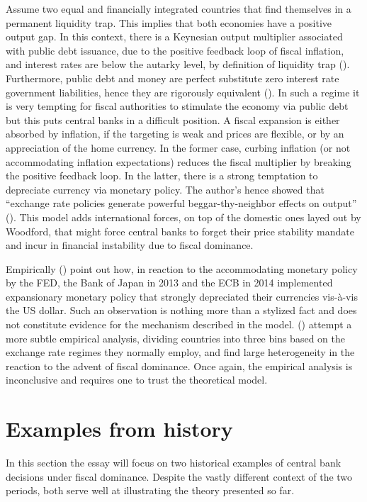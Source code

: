 \documentclass[american]{scrartcl}
\newcommand{\citein}[1]{\citeauthor{#1} (\citeyear{#1})}
\begin{document}
Assume two equal and financially integrated countries that find themselves in a permanent liquidity trap. This implies that both economies have a positive output gap. In this context, there is a Keynesian output multiplier associated with public debt issuance, due to the positive feedback loop of fiscal inflation, and interest rates are below the autarky level, by definition of liquidity trap (\cite[p. 41]{Caballero2016}). Furthermore, public debt and money are perfect substitute zero interest rate government liabilities, hence they are rigorously equivalent (\cite[p. 42]{Caballero2016}). In such a regime it is very tempting for fiscal authorities to stimulate the economy via public debt but this puts central banks in a difficult position. A fiscal expansion is either absorbed by inflation, if the targeting is weak and prices are flexible, or by an appreciation of the home currency. In the former case, curbing inflation (or not accommodating inflation expectations) reduces the fiscal multiplier by breaking the positive feedback loop. In the latter, there is a strong temptation to depreciate currency via monetary policy. The author's hence showed that ``exchange rate policies generate powerful beggar-thy-neighbor effects on output'' (\cite[p. 32]{Caballero2016}). This model adds international forces, on top of the domestic ones layed out by Woodford, that might force central banks to forget their price stability mandate and incur in financial instability due to fiscal dominance.

Empirically \citein{Caballero2016} point out how, in reaction to the accommodating monetary policy by the FED, the Bank of Japan in 2013 and the ECB in 2014 implemented expansionary monetary policy that strongly depreciated their currencies vis-à-vis the US dollar. Such an observation is nothing more than a stylized fact and does not constitute evidence for the mechanism described in the model. \citein{Ahmed2021} attempt a more subtle empirical analysis, dividing countries into three bins based on the exchange rate regimes they normally employ, and find large heterogeneity in the reaction to the advent of fiscal dominance. Once again, the empirical analysis is inconclusive and requires one to trust the theoretical model.

\section{Examples from history}

In this section the essay will focus on two historical examples of central bank decisions under fiscal dominance. Despite the vastly different context of the two periods, both serve well at illustrating the theory presented so far.
\end{document}

